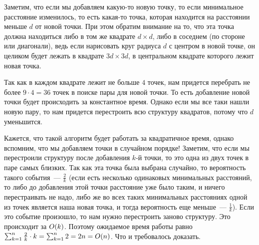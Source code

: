 Заметим, что если мы добавляем какую-то новую точку, то если минимальное расстояние изменилось, то есть какая-то точка, которая находится на расстоянии меньше $d$ от новой точки. При этом обратим внимание на то, что эта точка должна находиться либо в том же квадрате $d \times d$, либо в соседнем (по стороне или диагонали), ведь если нарисовать круг радиуса $d$ с центром в новой точке, он целиком будет лежать в квадрате $3d \times 3d$, в центральном квадрате которого лежит новая точка.


Так как в каждом квадрате лежит не больше $4$ точек, нам придется перебрать не более $9 \cdot 4 = 36$ точек в поиске пары для новой точки. То есть добавление новой точки будет происходить за константное время. Однако если мы все таки нашли новую пару, то нам придется перестроить всю структуру квадратов, потому что $d$ уменьшится.

Кажется, что такой алгоритм будет работать за квадратичное время, однако вспомним, что мы добавляем точки в случайном порядке! Заметим, что если мы перестроили структуру после добавления $k$-й точки, то это одна из двух точек в паре самых близких. Так как эта точка была выбрана случайно, то вероятность такого события~--- $\frac{2}{k}$ (если есть несколько одинаковых минимальных расстояний, то либо до добавления этой точки расстояние уже было таким, и ничего перестраивать не надо, либо же во всех таких минимальных расстояниях одной из точек является наша новая точка, и тогда вероятность еще меньше~--- $\frac{1}{k}$). Если это событие произошло, то нам нужно перестроить заново структуру. Это происходит за $O(k)$. Поэтому ожидаемое время работы равно $\sum_{k = 1}^{n} \frac{2}{k} \cdot k = \sum_{k = 1}^{n} 2 = 2n = O(n)$. Что и требовалось доказать.

